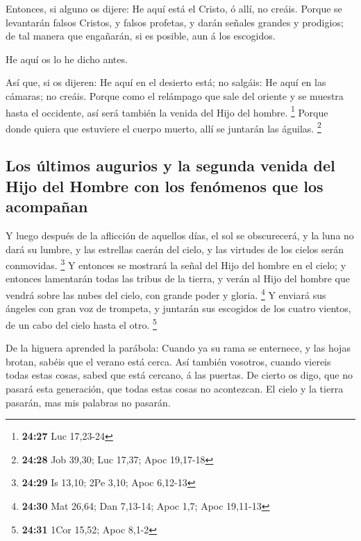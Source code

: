  Entonces, si alguno os dijere: He aquí está el Cristo, ó
allí, no creáis.  Porque se levantarán falsos Cristos, y
falsos profetas, y darán señales grandes y prodigios; de tal manera que
engañarán, si es posible, aun á los escogidos.

 He aquí os lo he dicho antes.

 Así que, si os dijeren: He aquí en el desierto está; no
salgáis: He aquí en las cámaras; no creáis.  Porque como
el relámpago que sale del oriente y se muestra hasta el occidente, así
será también la venida del Hijo del hombre. \footnote{\textbf{24:27} Luc
  17,23-24}  Porque donde quiera que estuviere el cuerpo
muerto, allí se juntarán las águilas. \footnote{\textbf{24:28} Job
  39,30; Luc 17,37; Apoc 19,17-18}

\hypertarget{los-uxfaltimos-augurios-y-la-segunda-venida-del-hijo-del-hombre-con-los-fenuxf3menos-que-los-acompauxf1an}{%
\subsection{Los últimos augurios y la segunda venida del Hijo del Hombre
con los fenómenos que los
acompañan}\label{los-uxfaltimos-augurios-y-la-segunda-venida-del-hijo-del-hombre-con-los-fenuxf3menos-que-los-acompauxf1an}}

 Y luego después de la aflicción de aquellos días, el sol
se obscurecerá, y la luna no dará su lumbre, y las estrellas caerán del
cielo, y las virtudes de los cielos serán conmovidas. \footnote{\textbf{24:29}
  Is 13,10; 2Pe 3,10; Apoc 6,12-13}  Y entonces se
mostrará la señal del Hijo del hombre en el cielo; y entonces lamentarán
todas las tribus de la tierra, y verán al Hijo del hombre que vendrá
sobre las nubes del cielo, con grande poder y gloria. \footnote{\textbf{24:30}
  Mat 26,64; Dan 7,13-14; Apoc 1,7; Apoc 19,11-13}  Y
enviará sus ángeles con gran voz de trompeta, y juntarán sus escogidos
de los cuatro vientos, de un cabo del cielo hasta el otro. \footnote{\textbf{24:31}
  1Cor 15,52; Apoc 8,1-2}

 De la higuera aprended la parábola: Cuando ya su rama se
enternece, y las hojas brotan, sabéis que el verano está cerca.
 Así también vosotros, cuando viereis todas estas cosas,
sabed que está cercano, á las puertas.  De cierto os
digo, que no pasará esta generación, que todas estas cosas no
acontezcan.  El cielo y la tierra pasarán, mas mis
palabras no pasarán.

